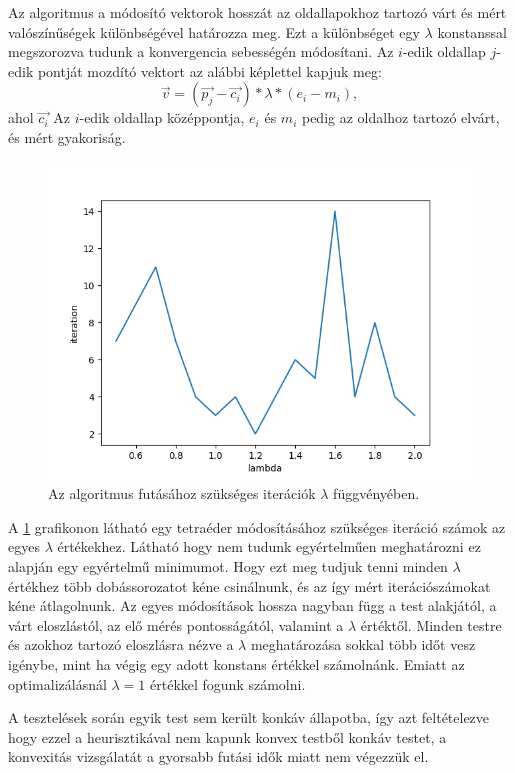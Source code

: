 Az algoritmus a módosító vektorok hosszát az oldallapokhoz tartozó várt és mért valószínűségek különbségével határozza meg.
Ezt a különbséget egy $\lambda$ konstanssal megszorozva tudunk a konvergencia sebességén módosítani.
Az $i$-edik oldallap $j$-edik pontját mozdító vektort az alábbi képlettel kapjuk meg:
\[
\vec{v} = (\vec{p_j} - \vec{c_i}) * \lambda * (e_i - m_i),
\]
ahol $\vec{c_i}$ Az $i$-edik oldallap középpontja, $e_i$ és $m_i$ pedig az oldalhoz tartozó elvárt, és mért gyakoriság.

\begin{figure}[h!]
	\centering
	\includegraphics[scale=0.7]{images/lambdatest.png}
	\caption{Az algoritmus futásához szükséges iterációk $\lambda$ függvényében.}
	\label{fig:lambda}
\end{figure}

A \ref{fig:lambda} grafikonon látható egy tetraéder módosításához szükséges iteráció számok az egyes $\lambda$ értékekhez.
Látható hogy nem tudunk egyértelműen meghatározni ez alapján egy egyértelmű minimumot.
Hogy ezt meg tudjuk tenni minden $\lambda$ értékhez több dobássorozatot kéne csinálnunk, és az így mért iterációszámokat kéne átlagolnunk.
Az egyes módosítások hossza nagyban függ a test alakjától, a várt eloszlástól, az elő mérés pontosságától, valamint a $\lambda$ értéktől.
Minden testre és azokhoz tartozó eloszlásra nézve a $\lambda$ meghatározása sokkal több időt vesz igénybe, mint ha végig egy adott konstans értékkel számolnánk.
Emiatt az optimalizálásnál $\lambda = 1$ értékkel fogunk számolni.

\begin{remark}
A tesztelések során egyik test sem került konkáv állapotba, így azt feltételezve hogy ezzel a heurisztikával nem kapunk konvex testből konkáv testet, a konvexitás vizsgálatát a gyorsabb futási idők miatt nem végezzük el.
\end{remark}